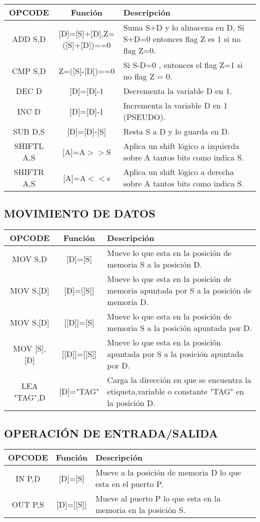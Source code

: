 \documentclass[12pt]{article}
\begin{document}
\begin{tabular}{| c | c |p{5.5cm}|}
\hline 
OPCODE & Funci\'on & Descripci\'on \\ \hline
ADD S,D & [D]=[S]+[D],Z=([S]+[D])==0 & Suma S+D y lo almacena en D, Si S+D=0 entonces flag Z es 1 si no flag Z=0.\\ \hline
CMP S,D &  Z=([S]-[D])==0 & Si S-D=0 , entonces el flag Z=1 si no flag Z = 0.\\  \hline
DEC D & [D]=[D]-1 & Decrementa la variable D en 1. \\ \hline
INC D & [D]=[D]-1 & Incrementa la variable D en 1 (PSEUDO).\\  \hline
SUB D,S & [D]=[D]-[S] & Resta S a D y lo guarda en D.\\ \hline
SHIFTL A,S & [A]=A$>>$S & Aplica un shift l\'ogico a izquierda sobre A tantos bits como indica S.\\ \hline
SHIFTR A,S & [A]=A$<<$s & Aplica un shift l\'ogico a derecha sobre A tantos bits como indica S.\\ \hline
\end{tabular}

\subsection{MOVIMIENTO DE DATOS}

\begin{tabular}{| c | c |p{8.5cm}|}
\hline 
OPCODE & Funci\'on & Descripci\'on \\ \hline
MOV S,D & [D]=[S]  & Mueve lo que esta en la posici\'on de memoria S a la posici\'on D.\\ \hline
MOV S,[D] &  [D]=[[S]]  & Mueve lo que esta en la posici\'on de memoria apuntada por S a la posici\'on de memoria D.\\  \hline
MOV S,[D] & [[D]]=[S]  & Mueve lo que esta en la posici\'on de memoria S a la posici\'on apuntada por D. \\ \hline
MOV [S],[D] & [[D]]=[[S]]  & Mueve lo que esta en la posici\'on apuntada por S a la posici\'on apuntada por D. \\ \hline
LEA "TAG",D & [D]="TAG" & Carga la direcci\'on en que se encuentra la etiqueta,variable o constante "TAG" en la posici\'on D.\\  \hline
\end{tabular}


\subsection{OPERACI\'ON DE ENTRADA/SALIDA}
\begin{tabular}{| c | c |p{9.5cm}|}
\hline 
OPCODE & Funci\'on & Descripci\'on \\ \hline
IN P,D & [D]=[S]  & Mueve a la posici\'on de memoria D lo que esta en el puerto P.\\ \hline
OUT P,S &  [D]=[[S]]  & Mueve al puerto P lo que esta en la memoria en la posici\'on S.\\  \hline
\end{tabular}
\end{document}
